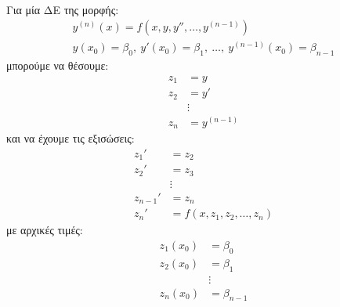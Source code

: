 \documentclass[11pt,a4paper,notitlepage,fleqn]{article}
\begin{document}
\paragraph{}
Για μία ΔΕ της μορφής:
\begin{gather*}
	y^{(n)}(x) = f\left(x,y,y'',\dots,y^{(n-1)}\right) \\
	y(x_0) = \beta_0,\ y'(x_0)=\beta_1,\ \dots,\ y^{(n-1)}(x_0)=
	\beta_{n-1}
\end{gather*}
μπορούμε να θέσουμε:
\begin{align*}
	z_1 &= y \\
	z_2 &= y' \\
	&\vdots \\
	z_n &= y^{(n-1)}
\end{align*}
και να έχουμε τις εξισώσεις:
\begin{align*}
	z_1' &= z_2 \\
	z_2' &= z_3 \\
	&\vdots \\
	z_{n-1}' &= z_n \\[3ex]
	z_n' &= f(x,z_1,z_2,\dots,z_n)
\end{align*}
με αρχικές τιμές:
\begin{align*}
	z_1(x_0) &= \beta_0 \\
	z_2(x_0) &= \beta_1 \\
	&\vdots \\
	z_n(x_0) &= \beta_{n-1}
\end{align*}
\end{document}
